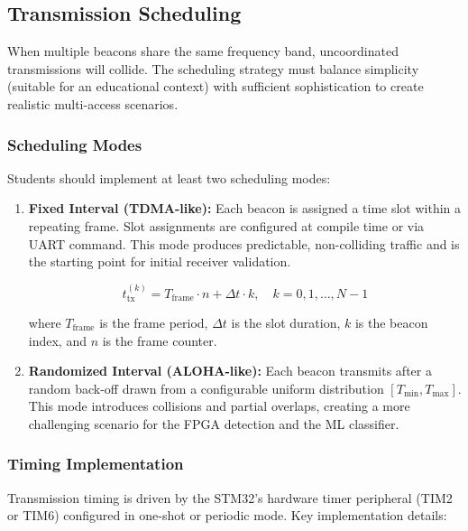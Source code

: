\documentclass[11pt,letterpaper]{article}
\begin{document}
	\subsection{Transmission Scheduling}
	
	When multiple beacons share the same frequency band, uncoordinated transmissions will collide. The scheduling strategy must balance simplicity (suitable for an educational context) with sufficient sophistication to create realistic multi-access scenarios.
	
	\subsubsection{Scheduling Modes}
	
	Students should implement at least two scheduling modes:
	
	\begin{enumerate}[leftmargin=2em]
		\item \textbf{Fixed Interval (TDMA-like):} Each beacon is assigned a time slot within a repeating frame. Slot assignments are configured at compile time or via UART command. This mode produces predictable, non-colliding traffic and is the starting point for initial receiver validation.
		
		\begin{equation}
			t_{\text{tx}}^{(k)} = T_{\text{frame}} \cdot n + \Delta t \cdot k, \quad k = 0, 1, \ldots, N-1
			\label{eq:tdma}
		\end{equation}
		
		where $T_{\text{frame}}$ is the frame period, $\Delta t$ is the slot duration, $k$ is the beacon index, and $n$ is the frame counter.
		
		\item \textbf{Randomized Interval (ALOHA-like):} Each beacon transmits after a random back-off drawn from a configurable uniform distribution $[T_{\min}, T_{\max}]$. This mode introduces collisions and partial overlaps, creating a more challenging scenario for the FPGA detection and the ML classifier.
	\end{enumerate}
	
	\subsubsection{Timing Implementation}
	
	Transmission timing is driven by the STM32's hardware timer peripheral (TIM2 or TIM6) configured in one-shot or periodic mode. Key implementation details:
	
\end{document}
